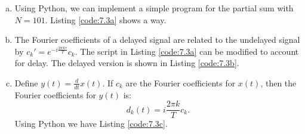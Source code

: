 \begin{enumerate}
        \begin{enumerate}[a)]
          \item Using Python, we can implement a simple program for the partial sum with $N=101$. Listing \ref{code:7.3a} shows a way.
                

          \item The Fourier coefficients of a delayed signal are related to the undelayed signal by $c_{k}'=e^{-i\frac{2\pi k\tau}{T}}c_{k}$.
                The script in Listing \ref{code:7.3a} can be modified to account for delay. The delayed version is shown in Listing \ref{code:7.3b}.
                

          \item Define $y(t)=\frac{d}{dt}x(t)$. If $c_{k}$ are the Fourier coefficients for $x(t)$, then the Fourier coefficients for $y(t)$ is:
                \[ d_{k}(t)=i \frac{2\pi k}{T}c_{k}. \]
                Using Python we have Listing \ref{code:7.3c}.
                

        \end{enumerate}

\end{enumerate}